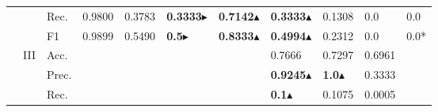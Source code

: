 \begin{tabular}{cclllllllll}
                                                                                           &                                   & Rec.                                                 & 0.9800                  & 0.3783                  & \textbf{0.3333}$\blacktriangleright$              & \textbf{0.7142}$\blacktriangle$        & \textbf{0.3333}$\blacktriangle$                                                             & 0.1308                                                                      & 0.0                                       & 0.0                                       \\
                                                                                           &                                   & F1                                                   & 0.9899                  & 0.5490                  & \textbf{0.5}$\blacktriangleright$                 & \textbf{0.8333}$\blacktriangle$        & \textbf{0.4994}$\blacktriangle$                                                             & 0.2312                                                                      & 0.0                                       & 0.0*                                      \\ 
    \cmidrule{2-11}
                                                                                           & \multirow{4}{*}{III}              & Acc.                                                 &                         &                         &                              &                         & 0.7666                                                                       & 0.7297                                                                      & 0.6961                                    &                                           \\
                                                                                           &                                   & Prec.                                                &                         &                         &                              &                         & \textbf{0.9245}$\blacktriangle$                                                             & \textbf{1.0}$\blacktriangle$                                                                & 0.3333                                    &                                           \\
                                                                                           &                                   & Rec.                                                 &                         &                         &                              &                         & \textbf{0.1}$\blacktriangle$                                                                & 0.1075                                                                      & 0.0005                                    &                                           \\

\end{tabular}
